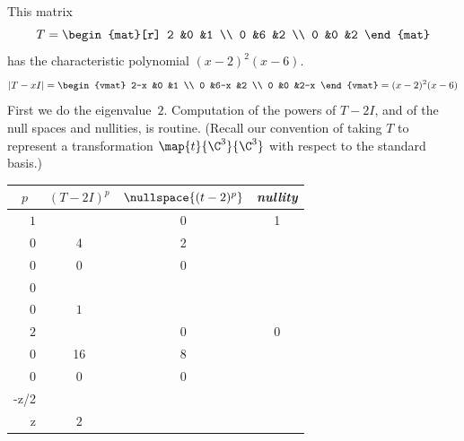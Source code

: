\begin{example} \label{ex:FirstJordForm}
This matrix 
\begin{equation*}
   T=
   \begin{mat}[r]
     2  &0  &1  \\
     0  &6  &2  \\
     0  &0  &2
   \end{mat}
\end{equation*}
has the characteristic polynomial \( (x-2)^2(x-6) \).
\begin{equation*}
   |T-xI|=
   \begin{vmat}
     2-x  &0    &1  \\
     0    &6-x  &2  \\
     0    &0    &2-x
   \end{vmat}
   =(x-2)^2(x-6)
\end{equation*}
First we do the eigenvalue~$2$.
Computation of the powers of $T-2I$, and of the null spaces and nullities, 
is routine.
(Recall our convention
of taking $T$ to represent a transformation $\map{t}{\C^3}{\C^3}$
with respect to the standard basis.)
\begin{center}
  \renewcommand{\arraystretch}{1.25}
  \begin{tabular}{r|ccc} 
    \multicolumn{1}{c}{\( p \)}  
         &\( (T-2I)^p \) &\( \nullspace{(t-2)^p}  \) 
         &\textit{nullity}                                            \\  
    \hline
    \( 1 \)
    &\matrixvenlarge{\begin{mat}[r]
          0  &0  &1  \\
          0  &4  &2  \\
          0  &0  &0
        \end{mat}}
    &\( \set{\matrixvenlarge{\colvec{x \\ 0 \\ 0}}
         \suchthat x\in\C}  \)  
    &$1$                                                   \\
    \( 2 \)
    &\matrixvenlarge{\begin{mat}[r]
          0  &0  &0  \\
          0  &16 &8  \\
          0  &0  &0
        \end{mat}}
    &\( \set{\matrixvenlarge{\colvec{x \\ -z/2 \\  z}}
               \suchthat x,z\in\C}  \) 
    &$2$                                                   \\

\end{tabular}
\end{center}
\end{example}
